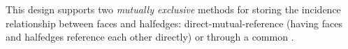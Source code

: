 This design supports two {\em mutually exclusive} methods for 
storing the incidence relationship between faces and halfedges:
direct-mutual-reference (having faces and halfedges reference 
each other directly) or through a common .

